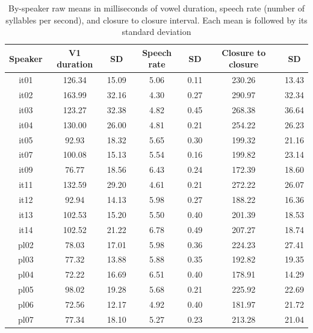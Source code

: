 \documentclass[preprint]{JASAnew}
\begin{document}
\begin{table}

\caption{\label{tab:acoustic-measures-table}By-speaker raw means in milliseconds of vowel duration, speech rate (number of syllables per second), and closure to closure interval. Each mean is followed by its standard deviation}
\centering
\fontsize{10}{12}\selectfont
\begin{tabular}[t]{ccccccc}
\toprule
Speaker & V1 duration & SD & Speech rate & SD & Closure to closure & SD\\
\midrule
it01 & 126.34 & 15.09 & 5.06 & 0.11 & 230.26 & 13.43\\
it02 & 163.99 & 32.16 & 4.30 & 0.27 & 290.97 & 32.34\\
it03 & 123.27 & 32.38 & 4.82 & 0.45 & 268.38 & 36.64\\
it04 & 130.00 & 26.00 & 4.81 & 0.21 & 254.22 & 26.23\\
it05 & 92.93 & 18.32 & 5.65 & 0.30 & 199.32 & 21.16\\
it07 & 100.08 & 15.13 & 5.54 & 0.16 & 199.82 & 23.14\\
it09 & 76.77 & 18.56 & 6.43 & 0.24 & 172.39 & 18.60\\
it11 & 132.59 & 29.20 & 4.61 & 0.21 & 272.22 & 26.07\\
it12 & 92.94 & 14.13 & 5.98 & 0.27 & 188.22 & 16.36\\
it13 & 102.53 & 15.20 & 5.50 & 0.40 & 201.39 & 18.53\\
it14 & 102.52 & 21.22 & 6.78 & 0.49 & 207.27 & 18.74\\
pl02 & 78.03 & 17.01 & 5.98 & 0.36 & 224.23 & 27.41\\
pl03 & 77.32 & 13.88 & 5.88 & 0.35 & 192.82 & 19.35\\
pl04 & 72.22 & 16.69 & 6.51 & 0.40 & 178.91 & 14.29\\
pl05 & 98.02 & 19.28 & 5.68 & 0.21 & 225.92 & 22.69\\
pl06 & 72.56 & 12.17 & 4.92 & 0.40 & 181.97 & 21.72\\
pl07 & 77.34 & 18.10 & 5.27 & 0.23 & 213.28 & 21.04\\
\bottomrule
\end{tabular}
\end{table}


\end{document}
